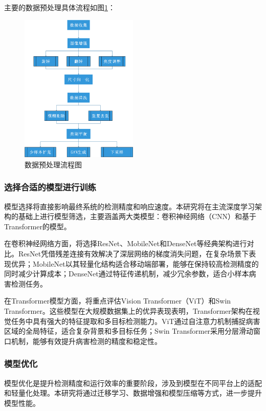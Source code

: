 主要的数据预处理具体流程如图\ref{fig:data_preprocessing}：

\begin{figure}[H]
	\centering
	\includegraphics[width=0.5\textwidth]{pictures/数据预处理流程图.png}
	\caption{数据预处理流程图}
	\label{fig:data_preprocessing}
\end{figure}


\subsubsection{选择合适的模型进行训练}
模型选择将直接影响最终系统的检测精度和响应速度。本研究将在主流深度学习架构的基础上进行模型筛选，主要涵盖两大类模型：卷积神经网络（CNN）和基于Transformer的模型。

在卷积神经网络方面，将选择ResNet、MobileNet和DenseNet等经典架构进行对比。ResNet凭借残差连接有效解决了深层网络的梯度消失问题，在复杂场景下表现优异；MobileNet以其轻量化结构适合移动端部署，能够在保持较高检测精度的同时减少计算成本；DenseNet通过特征传递机制，减少冗余参数，适合小样本病害检测任务。

在Transformer模型方面，将重点评估Vision Transformer（ViT）和Swin Transformer。这些模型在大规模数据集上的优异表现表明，Transformer架构在视觉任务中具有强大的特征提取和多目标检测能力。ViT通过自注意力机制捕捉病害区域的全局特征，适合复杂背景和多目标任务；Swin Transformer采用分层滑动窗口机制，能够有效提升病害检测的精度和稳定性。

\subsubsection{模型优化}
模型优化是提升检测精度和运行效率的重要阶段，涉及到模型在不同平台上的适配和轻量化处理。本研究将通过迁移学习、数据增强和模型压缩等方式，进一步提升模型性能。

